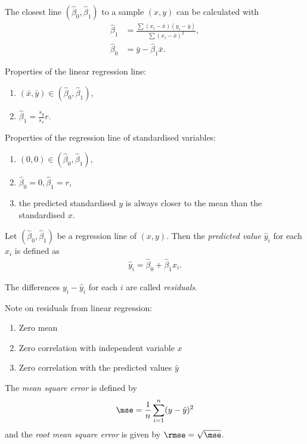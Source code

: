 \documentclass{article}
\begin{document}
\begin{theorem}
	The closest line $(\hat\beta_0,\hat\beta_1)$ to a sample $(x,y)$ can be calculated with
	\begin{align*}
		\hat\beta_1&=\frac{\sum(x_i-\bar x)(y_i-\bar y)}{\sum(x_i-\bar x)^2},\\
		\hat\beta_0&=\bar y - \hat\beta_1\bar x.
	\end{align*}
\end{theorem}
Properties of the linear regression line:
\begin{enumerate}
	\item $(\bar x, \bar y)\in(\hat\beta_0, \hat\beta_1)$,
	\item $\hat\beta_1 = \frac{s_y}{s_x}r$.
\end{enumerate}
Properties of the regression line of standardised variables:
\begin{enumerate}
	\item $(0,0)\in(\hat\beta_0,\hat\beta_1)$,
	\item $\hat\beta_0=0,\hat\beta_1=r$,
	\item the predicted standardised $y$ is always closer to the mean than the standardised $x$.
\end{enumerate}
\begin{definition}
	Let $(\hat\beta_0,\hat\beta_1)$ be a regression line of $(x,y)$. Then the
	\emph{predicted value} $\hat y_i$ for each $x_i$ is defined as
	\begin{align*}
		\hat y_i = \hat\beta_0 + \hat\beta_1 x_i.
	\end{align*}
\end{definition}
\begin{definition}
	The differences $y_i - \hat y_i$ for each $i$ are called \emph{residuals}.
\end{definition}
Note on residuals from linear regression:
\begin{enumerate}
	\item Zero mean
	\item Zero correlation with independent variable $x$
	\item Zero correlation with the predicted values $\hat y$
\end{enumerate}
\begin{definition}
	The \emph{mean square error} is defined by
	\begin{align*}
		\mse = \frac{1}{n}\sum_{i=1}^n (y-\hat y)^2
	\end{align*}
	and the \emph{root mean square error} is given by $\rmse=\sqrt{\mse}$.
\end{definition}
\end{document}
